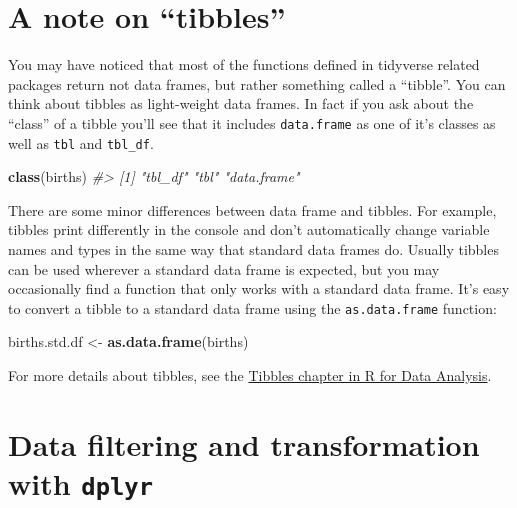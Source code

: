 \documentclass[]{book}
\newenvironment{Shaded}{\begin{snugshade}}{\end{snugshade}}
\newcommand{\CommentTok}[1]{\textcolor[rgb]{0.56,0.35,0.01}{\textit{#1}}}
\newcommand{\KeywordTok}[1]{\textcolor[rgb]{0.13,0.29,0.53}{\textbf{#1}}}
\newcommand{\NormalTok}[1]{#1}
\newcommand{\StringTok}[1]{\textcolor[rgb]{0.31,0.60,0.02}{#1}}
\theoremstyle{definition}
\theoremstyle{definition}
\theoremstyle{definition}
\theoremstyle{remark}
\begin{document}
\hypertarget{a-note-on-tibbles}{%
\section{A note on ``tibbles''}\label{a-note-on-tibbles}}

You may have noticed that most of the functions defined in tidyverse
related packages return not data frames, but rather something called a
``tibble''. You can think about tibbles as light-weight data frames. In
fact if you ask about the ``class'' of a tibble you'll see that it
includes \texttt{data.frame} as one of it's classes as well as
\texttt{tbl} and \texttt{tbl\_df}.

\begin{Shaded}
\begin{Highlighting}[]
\KeywordTok{class}\NormalTok{(births)}
\CommentTok{#> [1] "tbl_df"     "tbl"        "data.frame"}
\end{Highlighting}
\end{Shaded}

There are some minor differences between data frame and tibbles. For
example, tibbles print differently in the console and don't
automatically change variable names and types in the same way that
standard data frames do. Usually tibbles can be used wherever a standard
data frame is expected, but you may occasionally find a function that
only works with a standard data frame. It's easy to convert a tibble to
a standard data frame using the \texttt{as.data.frame} function:

\begin{Shaded}
\begin{Highlighting}[]
\NormalTok{births.std.df <-}\StringTok{ }\KeywordTok{as.data.frame}\NormalTok{(births)}
\end{Highlighting}
\end{Shaded}

For more details about tibbles, see the
\href{http://r4ds.had.co.nz/tibbles.html}{Tibbles chapter in R for Data
Analysis}.

\hypertarget{data-filtering-and-transformation-with-dplyr}{%
\section{\texorpdfstring{Data filtering and transformation with
\texttt{dplyr}}{Data filtering and transformation with dplyr}}\label{data-filtering-and-transformation-with-dplyr}}
\end{document}
